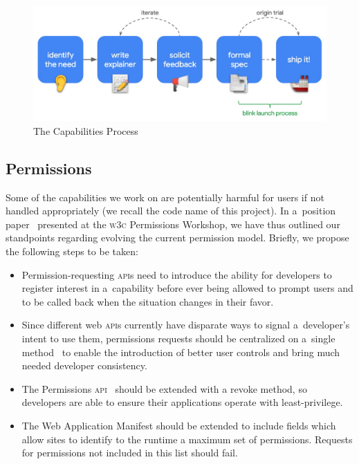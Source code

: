 \documentclass[sigconf, anonymous]{acmart}
\begin{document}
\begin{figure}[hbt]
  \includegraphics[width=\columnwidth]{capabilities-process.jpg}
  \caption{The Capabilities Process}
  \label{fig:fuguprocess}
\end{figure}


\subsection{Permissions}

Some of the capabilities we work on are potentially harmful for users
if not handled appropriately (we recall the code name of this project).
In a~position paper~\cite{russell18} presented at the \textsc{w3c} Permissions Workshop,
we have thus outlined our standpoints regarding evolving the current permission model.
Briefly, we propose the following steps to be taken:

\begin{itemize}
  \item Permission-requesting \textsc{api}s need to introduce the ability for
    developers to register interest in a~capability before ever being allowed to prompt users
    and to be called back when the situation changes in their favor.
  \item Since different web \textsc{api}s currently have disparate ways to signal
    a~developer's intent to use them, permissions requests should be centralized
    on a~single method~\cite{yasskin17} to enable the introduction
    of better user controls and bring much needed developer consistency.
  \item The Permissions \textsc{api}~\cite{lamouri19} should be extended with a revoke method,
    so developers are able to ensure their applications operate with least-privilege.
  \item The Web Application Manifest should be extended to include fields
    which allow sites to identify to the runtime a maximum set of permissions.
    Requests for permissions not included in this list should fail.
\end{itemize}
\end{document}
